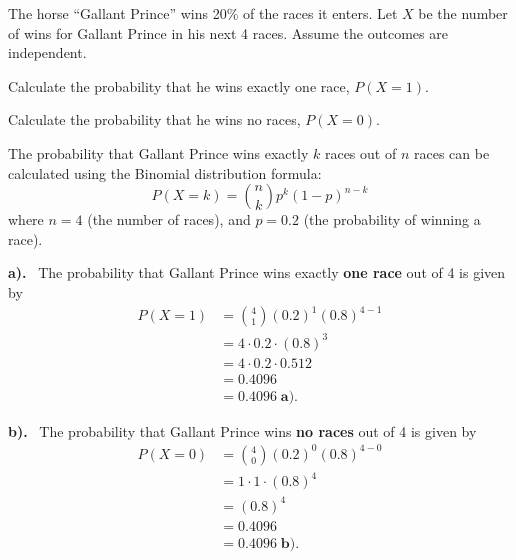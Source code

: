 \documentclass[a4paper, 10pt]{article}
\begin{document}
\begin{problem}
The horse ``Gallant Prince'' wins 20\% of the races it enters.
Let \( X \) be the number of wins for Gallant Prince in his next 4 races.
Assume the outcomes are independent.
\begin{subproblems_alpha}
	\item Calculate the probability that he wins exactly one race, \( P(X = 1) \).
	\item Calculate the probability that he wins no races, \( P(X = 0) \).
\end{subproblems_alpha}
\end{problem}

\begin{solution}
	The probability that Gallant Prince wins exactly \( k \) races out of \( n \) races
	can be calculated using the Binomial distribution formula:
	\[
		P(X = k) = \binom{n}{k} p^k (1-p)^{n-k}
	\]
	where \( n = 4 \) (the number of races), and \( p = 0.2 \) (the probability of winning a race).

	\par\noindent\textbf{a).} \, The probability that Gallant Prince wins exactly \textbf{one race} out of 4 is given by
	\begin{align*}
		P(X = 1) & = \binom{4}{1} (0.2)^1 (0.8)^{4-1} \\
		         & = 4 \cdot 0.2 \cdot (0.8)^3        \\
		         & = 4 \cdot 0.2 \cdot 0.512          \\
		         & = 0.4096                           \\
		         & = \boxed{0.4096} \; \textbf{a).}
	\end{align*}

	\par\noindent\textbf{b).} \, The probability that Gallant Prince wins \textbf{no races} out of 4 is given by
	\begin{align*}
		P(X = 0) & = \binom{4}{0} (0.2)^0 (0.8)^{4-0} \\
		         & = 1 \cdot 1 \cdot (0.8)^4          \\
		         & = (0.8)^4                          \\
		         & = 0.4096                           \\
		         & = \boxed{0.4096} \; \textbf{b).}
	\end{align*}

\end{solution}
\end{document}
